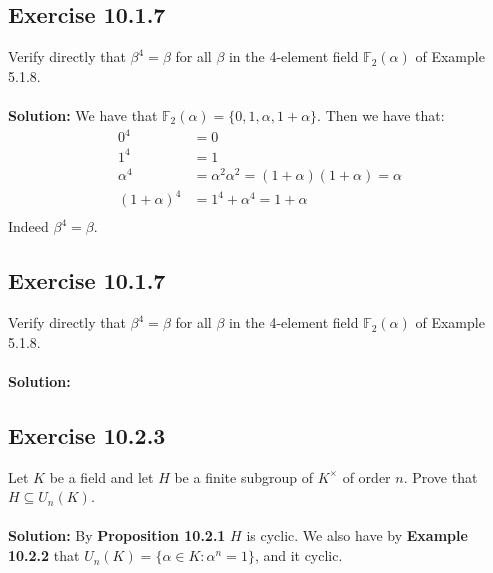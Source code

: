 \documentclass{article}
\begin{document}
\subsection*{Exercise 10.1.7}
Verify directly that $\beta^4 = \beta$ for all $\beta$ in the 4-element field $\mathbb{F}_2(\alpha)$ of Example 5.1.8. 
\\\\
\textbf{Solution:}
We have that $\mathbb{F}_2(\alpha) = \{0, 1, \alpha, 1+\alpha\}$. Then we have that:
\begin{equation*}
    \begin{aligned}
        0^4 &= 0\\
        1^4 &= 1\\
        \alpha^4 &= \alpha^2\alpha^2 = (1+\alpha)(1+\alpha) = \alpha\\
        (1+\alpha)^4 &= 1^4 + \alpha^4 = 1 + \alpha \\
    \end{aligned}
\end{equation*}
Indeed $\beta^4 = \beta$.

\subsection*{Exercise 10.1.7}
Verify directly that $\beta^4 = \beta$ for all $\beta$ in the 4-element field $\mathbb{F}_2(\alpha)$ of Example 5.1.8. 
\\\\
\textbf{Solution:}

\subsection*{Exercise 10.2.3}
Let $K$ be a field and let $H$ be a finite subgroup of $K^{\times}$ of order $n$.
Prove that $H \subseteq U_n(K)$.
\\\\
\textbf{Solution:}
By \textbf{Proposition 10.2.1} $H$ is cyclic. We also have by \textbf{Example 10.2.2} that
$U_n(K) = \{\alpha \in  K: \alpha^n= 1\}$, and it cyclic.
\end{document}

